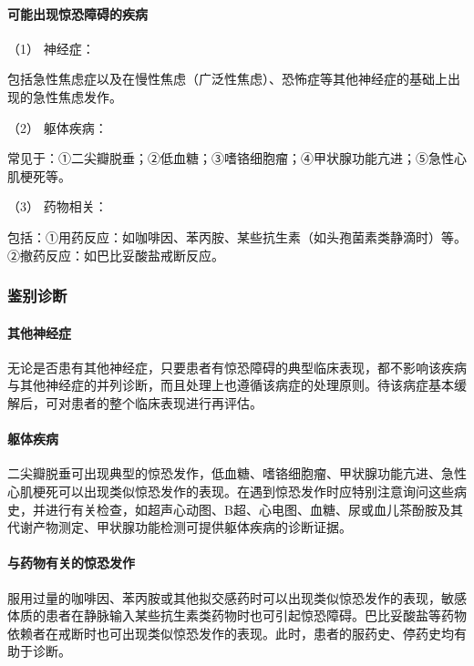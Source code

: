 \paragraph{可能出现惊恐障碍的疾病}

\hypertarget{text00051.htmlux5cux23CHP1-18-9-1-3-1}{}
（1） 神经症：

包括急性焦虑症以及在慢性焦虑（广泛性焦虑）、恐怖症等其他神经症的基础上出现的急性焦虑发作。

\hypertarget{text00051.htmlux5cux23CHP1-18-9-1-3-2}{}
（2） 躯体疾病：

常见于：①二尖瓣脱垂；②低血糖；③嗜铬细胞瘤；④甲状腺功能亢进；⑤急性心肌梗死等。

\hypertarget{text00051.htmlux5cux23CHP1-18-9-1-3-3}{}
（3） 药物相关：

包括：①用药反应：如咖啡因、苯丙胺、某些抗生素（如头孢菌素类静滴时）等。②撤药反应：如巴比妥酸盐戒断反应。

\subsubsection{鉴别诊断}

\paragraph{其他神经症}

无论是否患有其他神经症，只要患者有惊恐障碍的典型临床表现，都不影响该疾病与其他神经症的并列诊断，而且处理上也遵循该病症的处理原则。待该病症基本缓解后，可对患者的整个临床表现进行再评估。

\paragraph{躯体疾病}

二尖瓣脱垂可出现典型的惊恐发作，低血糖、嗜铬细胞瘤、甲状腺功能亢进、急性心肌梗死可以出现类似惊恐发作的表现。在遇到惊恐发作时应特别注意询问这些病史，并进行有关检查，如超声心动图、B超、心电图、血糖、尿或血儿茶酚胺及其代谢产物测定、甲状腺功能检测可提供躯体疾病的诊断证据。

\paragraph{与药物有关的惊恐发作}

服用过量的咖啡因、苯丙胺或其他拟交感药时可以出现类似惊恐发作的表现，敏感体质的患者在静脉输入某些抗生素类药物时也可引起惊恐障碍。巴比妥酸盐等药物依赖者在戒断时也可出现类似惊恐发作的表现。此时，患者的服药史、停药史均有助于诊断。

